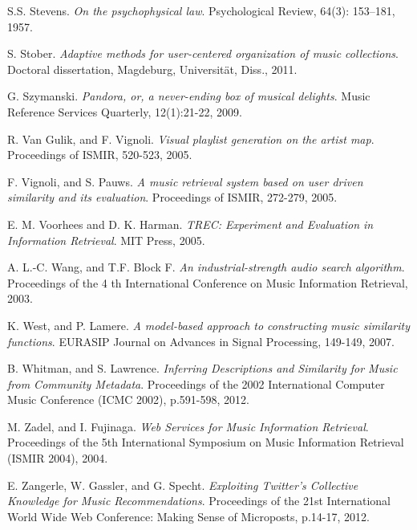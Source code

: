 \documentclass[11pt, oneside, openright]{Thesis} %
\begin{document}
\begin{thebibliography}{99}
S.S. Stevens. 
\textit{On the psychophysical law}. 
Psychological Review, 64(3): 153–181, 1957.

S. Stober.
\textit{Adaptive methods for user-centered organization of music collections}.
Doctoral dissertation, Magdeburg, Universität, Diss., 2011.

G. Szymanski.
\textit{Pandora, or, a never-ending box of musical delights}. 
Music Reference Services Quarterly, 12(1):21-22, 2009.

R. Van Gulik, and F. Vignoli.
\textit{Visual playlist generation on the artist map}.
Proceedings of ISMIR, 520-523, 2005.

F. Vignoli, and S. Pauws.
\textit{A music retrieval system based on user driven similarity and its evaluation}.
Proceedings of ISMIR, 272-279, 2005.

E. M. Voorhees and D. K. Harman. 
\textit{TREC: Experiment and Evaluation in Information Retrieval}. 
MIT Press, 2005.

A. L.-C. Wang, and T.F. Block F. 
\textit{An industrial-strength audio search algorithm}. 
Proceedings of the 4 th International Conference on Music Information Retrieval, 2003.

K. West, and P. Lamere.
\textit{A model-based approach to constructing music similarity functions}.
EURASIP Journal on Advances in Signal Processing, 149-149, 2007.

B. Whitman, and S. Lawrence.
\textit{Inferring Descriptions and Similarity for Music from Community Metadata}.
Proceedings of the 2002 International Computer Music Conference (ICMC 2002), p.591-598, 2012.
 
M. Zadel, and I. Fujinaga.
\textit{Web Services for Music Information Retrieval}.
Proceedings of the 5th International Symposium on Music Information Retrieval (ISMIR 2004), 2004.

E. Zangerle, W. Gassler, and G. Specht.
\textit{Exploiting Twitter's Collective Knowledge for Music Recommendations}.
Proceedings of the 21st International World Wide Web Conference: Making Sense of Microposts, p.14-17, 2012.

\end{thebibliography}


\end{document}
